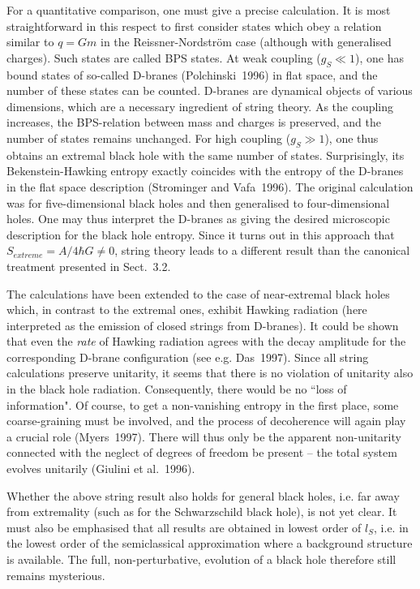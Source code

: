 For a quantitative comparison, one must give a precise
calculation. It is most straightforward in this respect to
first consider states which obey a relation similar to
$q=Gm$ in the Reissner-Nordstr\"om case
(although with generalised charges). Such states are called
BPS states.
 At weak coupling
($g_S\ll 1$), one has bound states of so-called D-branes
(Polchinski~1996) in flat space, and the number of these states
can be counted. D-branes are dynamical objects of various
dimensions, which are a necessary ingredient of string theory.
 As the coupling increases, the BPS-relation
between mass and charges is preserved, and the number of states
remains unchanged. For high coupling ($g_S\gg1$), one thus
obtains an extremal black hole with the same number of states.
Surprisingly, its Bekenstein-Hawking entropy exactly coincides
with the entropy of the D-branes in the flat space description
(Strominger and Vafa~1996). The original calculation was for
five-dimensional black holes and then generalised to four-dimensional
holes.
 One may thus interpret the D-branes
as giving the desired microscopic description for the black hole
entropy. Since it turns out in this approach that 
$S_{extreme}=A/4\hbar G\neq0$, string theory leads to a
different result than the canonical treatment presented in
Sect.~3.2. 

The calculations have been extended to the case of near-extremal
black holes which, in contrast to the extremal ones, exhibit
Hawking radiation (here interpreted as the emission of closed
strings from D-branes). It could be shown that even the {\em rate}
of Hawking radiation agrees with the decay amplitude for the
corresponding D-brane configuration
(see e.g. Das~1997). Since all string calculations preserve
unitarity, it seems that there is no violation of unitarity
also in the black hole radiation. Consequently, there
would be no ``loss of information". Of course, to get a
non-vanishing entropy in the first place, some coarse-graining
must be involved, and the process of decoherence will again 
play a crucial role (Myers~1997). There will thus only be the
apparent non-unitarity connected with the neglect of degrees of
freedom be present -- the total system evolves unitarily
(Giulini et al.~1996).  
 
Whether the above string result also holds for general black holes,
i.e. far away from extremality
(such as for the Schwarzschild black hole), is not yet clear.
It must also be emphasised that all results are obtained in
lowest order of $l_S$, i.e. in the lowest order of the semiclassical
approximation where a background structure is available. 
The full, non-perturbative, evolution of a black hole therefore
still remains mysterious.

